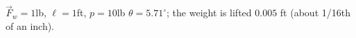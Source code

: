{$\vec F_w=1$lb, \quad $\ell = 1$ft, \quad $p = 10$lb
}
{$\theta = 5.71^\circ$; the weight is lifted $0.005$ ft (about 1/16th of an inch).
}
